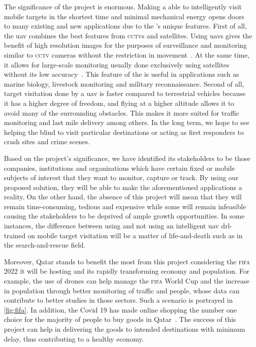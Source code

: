 \documentclass[../main.tex]{subfiles}
\begin{document}
The significance of the project is enormous. 
Making a \uav able to intelligently 
visit mobile targets in the shortest time
and minimal mechanical energy 
opens doors to many existing and new applications
due to the \uav's unique features.
First of all, the \gls{uav} combines the best features
from \textsc{cctv}s and satellites.
Using \glspl{uav} gives the benefit of high resolution images
for the purposes of surveillance and monitoring
similar to \textsc{cctv} cameras 
without the restriction in movement~\cite{Sha19}.
At the same time, it allows for large-scale monitoring 
usually done exclusively using satellites 
without its low accuracy~\cite{Sha19}.
This feature of the \uav is useful in applications
such as marine biology, livestock monitoring and military
reconnaissance.
Second of all, target visitation done by a \gls{uav}
is faster compared to terrestrial vehicles
because it has a higher degree of freedom, and
flying at a higher altitude 
allows it to avoid 
many of the surrounding obstacles.
This makes it more suited for traffic monitoring and last mile delivery
among others. In the long term, we hope to see \uavs helping the
blind to visit particular destinations or acting as first
responders to crash sites and crime scenes.

Based on the project's significance, we have identified 
its stakeholders to be 
those companies, institutions and organizations which
have certain fixed or mobile subjects of interest 
that they want to monitor, capture or track.
By using our proposed solution,
they will be able to make the aforementioned applications
a reality.
On the other hand, the absence of this project will mean that
they will remain
time-consuming, tedious and expensive
while some will remain infeasible
causing the stakeholders to be deprived of ample growth opportunities.
In some instances, the difference between using 
and not using an intelligent \gls{uav} 
\gls{drl}-trained on mobile target visitation
will be a matter of life-and-death
such as in the search-and-rescue field.

Moreover, Qatar stands to benefit the most from this project 
considering the \textsc{fifa} 2022 it will be hosting
and its rapidly transforming economy and population.
For example, the use of drones can help manage 
the \textsc{fifa} World Cup 
and the increase in population through better monitoring 
of traffic and people, whose data can contribute
to better studies in those sectors. Such a scenario 
is portrayed in \cref{fig:fifa}.
In addition, the Covid 19 has made online shopping
the number one choice for 
the majority of people to buy goods in Qatar~\cite{Has20}.
The success of this project can help in delivering
the goods to intended destinations with minimum delay,
thus contributing to a healthy economy.
\end{document}
